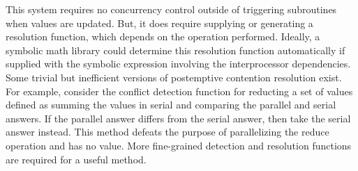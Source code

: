 \begin{comment}
$p$ performs its tasks that depend on $d_q$, it runs one of two coroutines.
Before $q$ updates the reference to the vector, it increments a counter. After
$q$ updates the reference, it does nothing. When $q$ finishes computing its
value for $d_q$, it must update the reference that $p$ uses so that $p$ can see
the update because the references act as if they were immutable. It also changes
the coroutine that $p$ runs when it computes a value that depends on $q$.
Finally, it looks at the value of the counter that $p$ kept for it. Knowing the
set of values in $G_p$ that depend on $d_q$ and the order that $p$ computes
them, it runs its resolution function $R_q$ on each value in $p$ that computed
before $q$ performed the computation they depended upon. Because $q$ knows how
its value integrates into the values of $p$ that depend on it, and because it
knows the values that $p$ actually used to perform the erroneous computations,
a concrete function $R_q$ exists can can be written or generated. Note that
in the general case where values in $G_p$ may have more dependencies on values
in $q$ or other processors, there's no guarantee that the value it resolves
corresponds to the final, correct value. Other resolutions might need to take
place before achieving that guarantee. In the worst case, $p$ completes all of
its computation before $q$ has done anything. Then, $q$ will essentially, by
resolving all values in $p$, perform the entire computation of values in $p$
dependent on $q$ in serial. In the best case, $q$ doesn't have to perform a
single resolution, achieving nearly maximal parallelism. To optimize this
process, $p$ should perform computations that are not dependent on $q$ while $q$
runs its resolution functions; otherwise, it risks generating more values in
need of resolution. Once all resolution has been performed on a particular
value, the reference containing the old version of that value can be freed from
memory, as it no longer serves a purpose.
\end{comment}

This system requires no concurrency control outside of triggering subroutines 
when values are updated. But, it does require supplying or generating a
resolution function, which depends on the operation performed. Ideally, a
symbolic math library could determine this resolution function automatically if
supplied with the symbolic expression involving the interprocessor dependencies.
Some trivial but inefficient versions of postemptive contention resolution
exist. For example, consider the conflict detection function for reducting a set
of values defined as summing the values in serial and comparing the parallel and
serial answers. If the parallel answer differs from the serial answer, then take
the serial answer instead. This method defeats the purpose of parallelizing the
reduce operation and has no value. More fine-grained detection and resolution
functions are required for a useful method.

